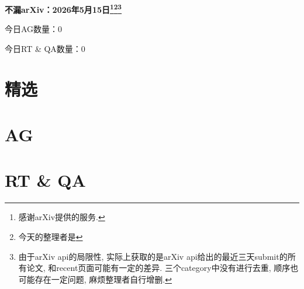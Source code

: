 \documentclass[9pt, a4paper]{article}
\theoremstyle{plain}
\theoremstyle{definition}
\theoremstyle{remark}
\newcommand{\AGnumber}{0}
\newcommand{\RTQAnumber}{0}
\newcommand{\NewestDate}{2026年5月15日}
\newcommand{\todayarXiver}{} %
\begin{document}
\begin{center}
    \Huge\textbf{不漏arXiv：\NewestDate\footnote{感谢arXiv提供的服务.}\footnote{今天的整理者是\todayarXiver}\footnote{由于arXiv api的局限性, 实际上获取的是arXiv api给出的最近三天submit的所有论文, 和recent页面可能有一定的差异. 三个category中没有进行去重, 顺序也可能存在一定问题, 麻烦整理者自行增删.}} \\
\end{center}

\setcounter{section}{-1}

\begin{center}
    今日AG数量：\AGnumber
    
    今日RT \& QA数量：\RTQAnumber
    
\end{center}


\section{精选}


\section{AG}

\section{RT \& QA}
\end{document}
